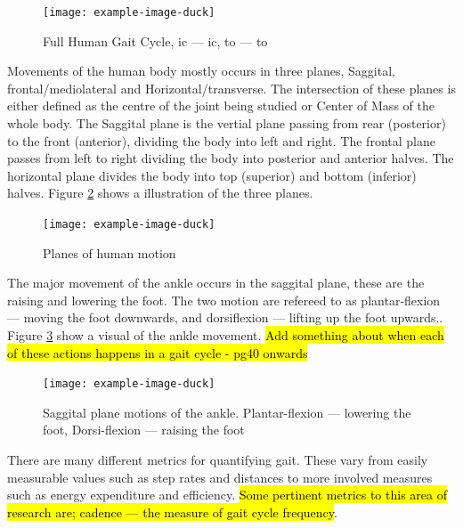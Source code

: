 \begin{figure}[hbt!]
    \centering
    \texttt{[image: example-image-duck]}
    \caption[Full Human Gait Cycle]{Full Human Gait Cycle, \acrshort{ic} --- \acrlong{ic}, \acrshort{to} --- \acrlong{to}}
    \label{fig:background_gait_cycle}
\end{figure}

Movements of the human body mostly occurs in three planes, Saggital, frontal/mediolateral and Horizontal/transverse. The intersection of these planes is either defined as the centre of the joint being studied or Center of Mass of the whole body. The Saggital plane is the vertial plane passing from rear (posterior) to the front (anterior), dividing the body into left and right. The frontal plane passes from left to right dividing the body into posterior and anterior halves. The horizontal plane divides the body into top (superior) and bottom (inferior) halves.\cite{Bartlett2007} Figure \ref{fig:background_planes_of_the_body} shows a illustration of the three planes.

\begin{figure}[!hbt]
    \centering
    \texttt{[image: example-image-duck]}
    \caption{Planes of human motion}
    \label{fig:background_planes_of_the_body}
\end{figure}

The major movement of the ankle occurs in the saggital plane, these are the raising and lowering the foot. The two motion are refereed to as plantar-flexion --- moving the foot downwards, and dorsiflexion --- lifting up the foot upwards.\cite{Bartlett2007}. Figure \ref{fig:background_plantar_dorsi_flexion} show a visual of the ankle movement. \hl{Add something about when each of these actions happens in a gait cycle{\cite{Whittle2012}} - pg40 onwards}

\begin{figure}[!hbt]
    \centering
    \texttt{[image: example-image-duck]}
    \caption{Saggital plane motions of the ankle. Plantar-flexion --- lowering the foot, Dorsi-flexion --- raising the foot}
    \label{fig:background_plantar_dorsi_flexion}
\end{figure}


There are many different metrics for quantifying gait. These vary from easily measurable values such as step rates and distances to more involved measures such as energy expenditure and efficiency. \hl{Some pertinent metrics to this area of research are; cadence --- the measure of gait cycle frequency}\cite{Ramakrishnan2019, Coutts1999}.


